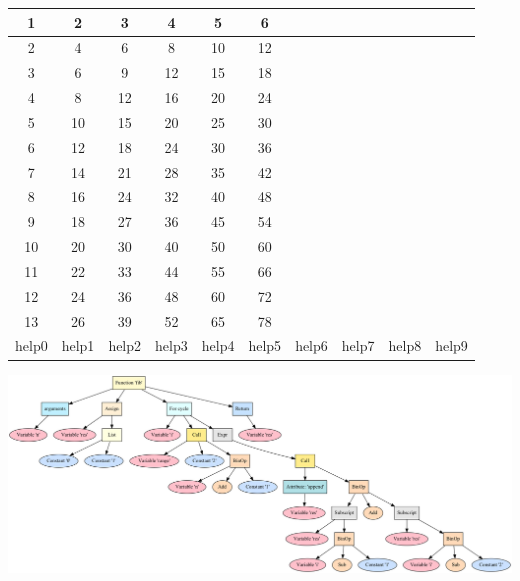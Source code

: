 \documentclass[12pt]{article}
\begin{document}
\begin{tabular}{ |c|c|c|c|c|c|c|c|c|c|}
\hline
1 & 2 & 3 & 4 & 5 & 6 &  &  &  &  \\
\hline
2 & 4 & 6 & 8 & 10 & 12 &  &  &  &  \\
\hline
3 & 6 & 9 & 12 & 15 & 18 &  &  &  &  \\
\hline
4 & 8 & 12 & 16 & 20 & 24 &  &  &  &  \\
\hline
5 & 10 & 15 & 20 & 25 & 30 &  &  &  &  \\
\hline
6 & 12 & 18 & 24 & 30 & 36 &  &  &  &  \\
\hline
7 & 14 & 21 & 28 & 35 & 42 &  &  &  &  \\
\hline
8 & 16 & 24 & 32 & 40 & 48 &  &  &  &  \\
\hline
9 & 18 & 27 & 36 & 45 & 54 &  &  &  &  \\
\hline
10 & 20 & 30 & 40 & 50 & 60 &  &  &  &  \\
\hline
11 & 22 & 33 & 44 & 55 & 66 &  &  &  &  \\
\hline
12 & 24 & 36 & 48 & 60 & 72 &  &  &  &  \\
\hline
13 & 26 & 39 & 52 & 65 & 78 &  &  &  &  \\
\hline
help0 & help1 & help2 & help3 & help4 & help5 & help6 & help7 & help8 & help9 \\
\hline
\end{tabular}

\includegraphics[scale=0.25]{AST.png}
\end{document}
